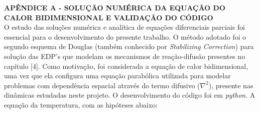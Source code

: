 \setcounter{section}{0}
\setcounter{chapter}{0}%
 \renewcommand{\theequation}{A.\arabic{equation}}    
\noindent\textbf{APÊNDICE A - SOLUÇÃO NUMÉRICA DA EQUAÇÃO DO CALOR BIDIMENSIONAL E VALIDAÇÃO DO CÓDIGO}
$\!$\\


O estudo das soluções numérica e analítica de equações diferenciais parciais foi essencial para o desenvolvimento do presente trabalho. O método adotado foi o segundo esquema de Douglas \cite{DOUGLAS} (também conhecido por \textit{Stabilizing Correction}) para solução das EDP's que modelam os mecanismos de reação-difusão presentes no capítulo [4]. Como motivação, foi considerada a equação de calor bidimensional, uma vez que ela configura uma equação parabólica utilizada para modelar problemas com dependência espacial através do termo difusivo ($\nabla^2$), presente nas dinâmicas estudadas neste projeto. O desenvolvimento do código foi em \textit{python}. A equação da temperatura, com as hipóteses abaixo: 












